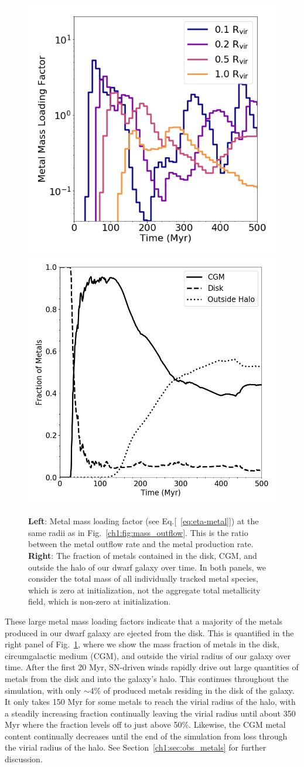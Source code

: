\begin{figure}
\includegraphics[width=0.475\linewidth]{figures/ch1/metal_mass_loading}
\includegraphics[width=0.475\linewidth]{figures/ch1/metal_retention}
\caption{{\bf Left}: Metal mass loading factor (see Eq.[~\ref{eq:eta-metal}]) at the same radii as in Fig.~\ref{ch1:fig:mass_outflow}. This is the ratio between the metal outflow rate and the metal production rate. {\bf Right}: The fraction of metals contained in the disk, CGM, and outside the halo of our dwarf galaxy over time. In both panels, we consider the total mass of all individually tracked metal species, which is zero at initialization, not the aggregate total metallicity field, which is non-zero at initialization.}
\label{ch1:fig:metal_evolution}
\end{figure}

These large metal mass loading factors indicate that a majority of the metals produced in our dwarf galaxy are ejected from the disk. This is quantified in the right panel of Fig.~\ref{ch1:fig:metal_evolution}, where we show the mass fraction of metals in the disk, circumgalactic medium (CGM), and outside the virial radius of our galaxy over time. After the first 20 Myr, SN-driven winds rapidly drive out large quantities of metals from the disk and into the galaxy's halo. This continues throughout the simulation, with only $\sim$4\% of produced metals residing in the disk of the galaxy. It only takes 150 Myr for some metals to reach the virial radius of the halo, with a steadily increasing fraction continually leaving the virial radius until about 350 Myr where the fraction levels off to just above 50\%. Likewise, the CGM metal content continually decreases until the end of the simulation from loss through the virial radius of the halo. See Section~\ref{ch1:sec:obs_metals} for further discussion.

